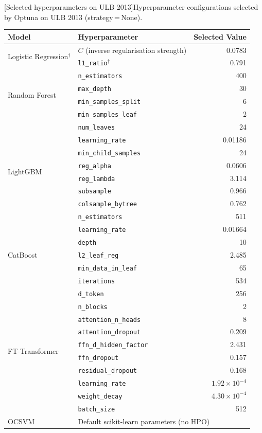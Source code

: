 \par\medskip\noindent\begin{minipage}{\linewidth}\centering
\small
{}[Selected hyperparameters on ULB 2013]{Hyperparameter configurations selected by Optuna on ULB 2013 (strategy\,=\,None).}
\label{tab:hyperparams_ulb}
\begin{tabular}{l l r}
\toprule
Model & Hyperparameter & Selected Value \\
\midrule
\multirow{2}{*}{Logistic Regression$^\dagger$}
  & $C$ (inverse regularisation strength) & 0.0783 \\
  & \texttt{l1\_ratio}$^\dagger$ & 0.791 \\
\midrule
\multirow{4}{*}{Random Forest}
  & \texttt{n\_estimators} & 400 \\
  & \texttt{max\_depth} & 30 \\
  & \texttt{min\_samples\_split} & 6 \\
  & \texttt{min\_samples\_leaf} & 2 \\
\midrule
\multirow{8}{*}{LightGBM}
  & \texttt{num\_leaves} & 24 \\
  & \texttt{learning\_rate} & 0.01186 \\
  & \texttt{min\_child\_samples} & 24 \\
  & \texttt{reg\_alpha} & 0.0606 \\
  & \texttt{reg\_lambda} & 3.114 \\
  & \texttt{subsample} & 0.966 \\
  & \texttt{colsample\_bytree} & 0.762 \\
  & \texttt{n\_estimators} & 511 \\
\midrule
\multirow{5}{*}{CatBoost}
  & \texttt{learning\_rate} & 0.01664 \\
  & \texttt{depth} & 10 \\
  & \texttt{l2\_leaf\_reg} & 2.485 \\
  & \texttt{min\_data\_in\_leaf} & 65 \\
  & \texttt{iterations} & 534 \\
\midrule
\multirow{10}{*}{FT-Transformer}
  & \texttt{d\_token} & 256 \\
  & \texttt{n\_blocks} & 2 \\
  & \texttt{attention\_n\_heads} & 8 \\
  & \texttt{attention\_dropout} & 0.209 \\
  & \texttt{ffn\_d\_hidden\_factor} & 2.431 \\
  & \texttt{ffn\_dropout} & 0.157 \\
  & \texttt{residual\_dropout} & 0.168 \\
  & \texttt{learning\_rate} & $1.92 \times 10^{-4}$ \\
  & \texttt{weight\_decay} & $4.30 \times 10^{-4}$ \\
  & \texttt{batch\_size} & 512 \\
\midrule
OCSVM & \multicolumn{2}{l}{Default scikit-learn parameters (no HPO)} \\
\bottomrule
\end{tabular}
\end{minipage}\par\medskip

